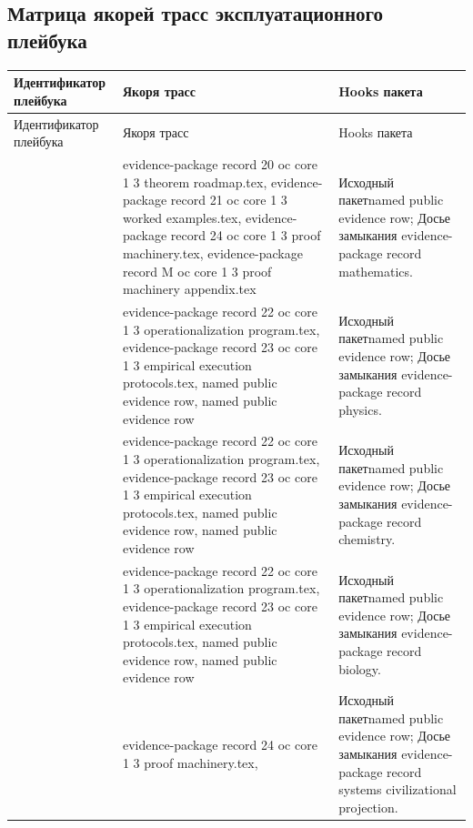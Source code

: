 \subsection{Матрица якорей трасс эксплуатационного плейбука}
\begin{longtable}{@{}L{0.16\textwidth}L{0.38\textwidth}L{0.34\textwidth}@{}}
\toprule
Идентификатор плейбука & Якоря трасс & Hooks пакета \\
\midrule
\endfirsthead
\toprule
Идентификатор плейбука & Якоря трасс & Hooks пакета \\
\midrule
\endhead
{} & evidence-package record 20 oc core 1 3 theorem roadmap.tex, \allowbreak evidence-package record 21 oc core 1 3 worked examples.tex, \allowbreak evidence-package record 24 oc core 1 3 proof machinery.tex, \allowbreak evidence-package record M oc core 1 3 proof machinery appendix.tex & Исходный пакетnamed public evidence row; Досье замыкания evidence-package record mathematics. \\
 & evidence-package record 22 oc core 1 3 operationalization program.tex, \allowbreak evidence-package record 23 oc core 1 3 empirical execution protocols.tex, named public evidence row, named public evidence row & Исходный пакетnamed public evidence row; Досье замыкания evidence-package record physics. \\
 & evidence-package record 22 oc core 1 3 operationalization program.tex, \allowbreak evidence-package record 23 oc core 1 3 empirical execution protocols.tex, named public evidence row, named public evidence row & Исходный пакетnamed public evidence row; Досье замыкания evidence-package record chemistry. \\
 & evidence-package record 22 oc core 1 3 operationalization program.tex, \allowbreak evidence-package record 23 oc core 1 3 empirical execution protocols.tex, named public evidence row, named public evidence row & Исходный пакетnamed public evidence row; Досье замыкания evidence-package record biology. \\
 & evidence-package record 24 oc core 1 3 proof machinery.tex, \allowbreak {} & Исходный пакетnamed public evidence row; Досье замыкания evidence-package record systems civilizational projection. \\
\bottomrule
\end{longtable}

